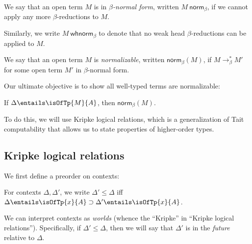 \documentclass[letterpaper]{article}
\newcommand{\De}[0]{\Delta}
\newcommand{\betaReducesTo}[0]{\to_\beta}
\newcommand{\whBetaNormal}[1]{#1\ \mathsf{whnorm}_\beta}
\newcommand{\betaNormal}[1]{#1\ \mathsf{norm}_\beta}
\newcommand{\betaNorm}[1]{\mathsf{norm}_\beta(#1)}
\begin{document}
\begin{definition}
We say that an open term $M$ is in \emph{$\beta$-normal form}, written
$\betaNormal{M}$, if we cannot apply any
more $\beta$-reductions to $M$.

Similarly, we write $\whBetaNormal{M}$ to denote that no weak head
$\beta$-reductions can be applied to $M$.
\end{definition}

\begin{definition}[Normalizability]
We say that an open term $M$ is \emph{normalizable}, written $\betaNorm{M}$,
if $M \betaReducesTo^* M'$ for some open term $M'$ in $\beta$-normal form.
\end{definition}

Our ultimate objective is to show all well-typed terms are normalizable:
\begin{theorem}
If $\De \entails \isOfTp{M}{A}$, then $\betaNorm{M}$.
\end{theorem}

To do this, we will use Kripke logical relations, which is a generalization of
Tait computability that allows us to state properties of higher-order types.

\subsection{Kripke logical relations}

We first define a preorder on contexts:
\begin{definition}
For contexts $\De, \De'$, we write $\De' \leq \De$ iff $\De \entails
\isOfTp{x}{A} \limp \De' \entails \isOfTp{x}{A}$.
\end{definition}

We can interpret contexts as \emph{worlds} (whence the ``Kripke'' in ``Kripke
logical relations''). Specifically, if $\De' \leq \De$, then we will say that $\De'$
is in the \emph{future} relative to $\De$.
\end{document}

